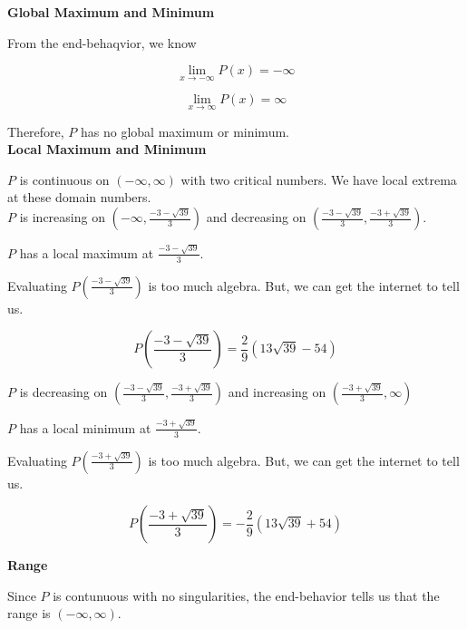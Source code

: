 \documentclass{ximera}
\begin{document}
\textbf{Global Maximum and Minimum}


From the end-behaqvior, we know

\[
\lim\limits_{x \to -\infty} P(x) = -\infty 
\]




\[
\lim\limits_{x \to \infty} P(x) = \infty 
\]



Therefore, $P$ has no global maximum or minimum. \\







\textbf{Local Maximum and Minimum}


$P$ is continuous on $(-\infty, \infty)$ with two critical numbers. We have local extrema at these domain numbers.\\







$P$ is increasing on $\left( -\infty, \frac{-3 - \sqrt{39}}{3} \right)$ and decreasing on $\left( \frac{-3 - \sqrt{39}}{3}, \frac{-3 + \sqrt{39}}{3} \right)$.

$P$ has a local maximum at $\frac{-3 - \sqrt{39}}{3}$.


Evaluating $P\left( \frac{-3 - \sqrt{39}}{3} \right)$ is too much algebra.  But, we can get the internet to tell us.

\[
P\left( \frac{-3 - \sqrt{39}}{3} \right) = \frac{2}{9} (13 \sqrt{39} - 54)
\]


$P$ is decreasing on $\left( \frac{-3 - \sqrt{39}}{3}, \frac{-3 + \sqrt{39}}{3} \right)$ and increasing on $\left( \frac{-3 + \sqrt{39}}{3}, \infty \right)$


$P$ has a local minimum at $\frac{-3 + \sqrt{39}}{3}$.



Evaluating $P\left( \frac{-3 + \sqrt{39}}{3} \right)$ is too much algebra.  But, we can get the internet to tell us.

\[
P\left( \frac{-3 + \sqrt{39}}{3} \right) = -\frac{2}{9} (13 \sqrt{39} + 54)
\]






\textbf{Range}

Since $P$ is contunuous with no singularities, the end-behavior tells us that the range is $(-\infty, \infty)$.\\
\end{document}
